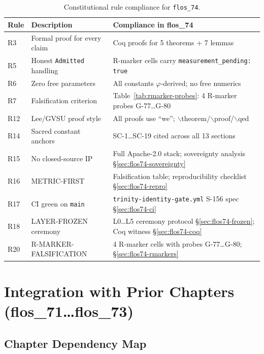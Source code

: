 \begin{table}[h]
\centering
\caption{Constitutional rule compliance for \texttt{flos\_74}.}
\label{tab:rrules}
\begin{tabular}{lll}
\hline
Rule & Description & Compliance in flos\_74 \\
\hline
R3 & Formal proof for every claim & Coq proofs for 5 theorems + 7 lemmas \\
R5 & Honest \texttt{Admitted} handling & R-marker cells carry \texttt{measurement\_pending: true} \\
R6 & Zero free parameters & All constants \(\varphi\)-derived; no free numerics \\
R7 & Falsification criterion & Table~\ref{tab:rmarker-probes}: 4 R-marker probes G-77\ldots G-80 \\
R12 & Lee/GVSU proof style & All proofs use ``we''; \(\backslash\)theorem/\(\backslash\)proof/\(\backslash\)qed \\
R14 & Sacred constant anchors & SC-1\ldots SC-19 cited across all 13 sections \\
R15 & No closed-source IP & Full Apache-2.0 stack; sovereignty analysis \S\ref{sec:flos74-sovereignty} \\
R16 & METRIC-FIRST & Falsification table; reproducibility checklist \S\ref{sec:flos74-repro} \\
R17 & CI green on \texttt{main} & \texttt{trinity-identity-gate.yml} S-156 spec \S\ref{sec:flos74-ci} \\
R18 & LAYER-FROZEN ceremony & L0\ldots L5 ceremony protocol \S\ref{sec:flos74-frozen}; Coq witness \S\ref{sec:flos74-coq} \\
R20 & R-MARKER-FALSIFICATION & 4 R-marker cells with probes G-77\ldots G-80; \S\ref{sec:flos74-rmarkers} \\
\hline
\end{tabular}
\end{table}


\section{Integration with Prior Chapters (flos\_71\ldots flos\_73)}
\label{sec:flos74-integration}

\subsection{Chapter Dependency Map}


